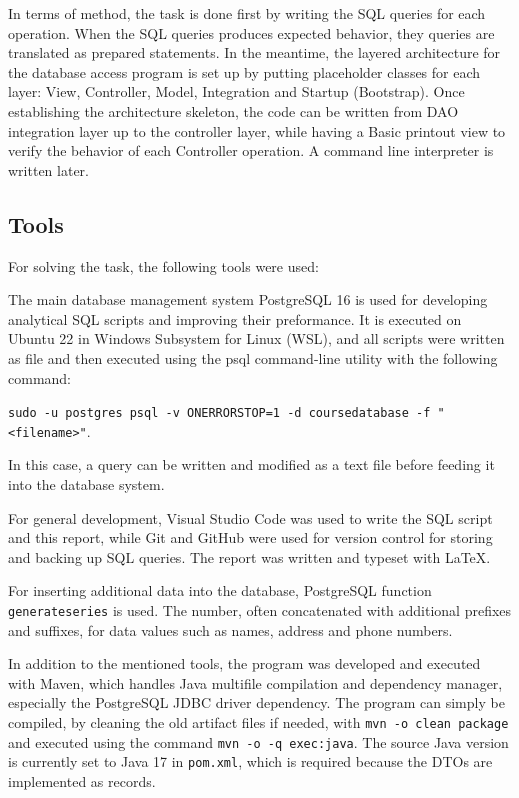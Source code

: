 \documentclass[a4paper]{scrartcl}
\renewcommand{\_}{\textunderscore\allowbreak}
\begin{document}
In terms of method, the task is done first by writing the SQL queries for each operation. When the SQL queries produces expected behavior, they queries are translated as prepared statements. In the meantime, the layered architecture for the database access program is set up by putting placeholder classes for each layer: View, Controller, Model, Integration and Startup (Bootstrap). Once establishing the architecture skeleton, the code can be written from DAO integration layer up to the controller layer, while having a Basic printout view to verify the behavior of each Controller operation. A command line interpreter is written later.

\subsection{Tools}

For solving the task, the following tools were used:

The main database management system PostgreSQL 16 is used for developing analytical SQL scripts and improving their preformance. It is executed on Ubuntu 22 in Windows Subsystem for Linux (WSL), and all scripts were written as file and then executed using the psql command-line utility with the following command:

\texttt{sudo -u postgres psql -v ON\_ERROR\_STOP=1 -d course\_database -f "<file\_name>"}.

In this case, a query can be written and modified as a text file before feeding it into the database system.

For general development, Visual Studio Code was used to write the SQL script and this report, while Git and GitHub were used for version control for storing and backing up SQL queries. The report was written and typeset with \LaTeX.

For inserting additional data into the database, PostgreSQL function \texttt{generate\_series} is used. The number, often concatenated with additional prefixes and suffixes, for data values such as names, address and phone numbers.

In addition to the mentioned tools, the program was developed and executed with Maven, which handles Java multifile compilation and dependency manager, especially the PostgreSQL JDBC driver dependency. The program can simply be compiled, by cleaning the old artifact files if needed, with \texttt{mvn -o clean package} and executed using the command \texttt{mvn -o -q exec:java}. The source Java version is currently set to Java 17 in \texttt{pom.xml}, which is required because the DTOs are implemented as records.
\end{document}

